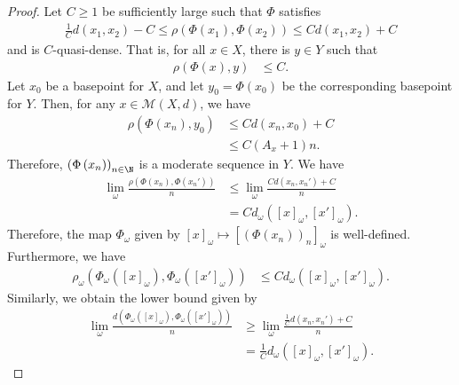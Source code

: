 \documentclass[10pt]{mypackage}
\begin{document}
\begin{proof}
  Let $C \geq 1$ be sufficiently large such that $\Phi$ satisfies
  \begin{align*}
    \frac{1}{C}d\left( x_1,x_2 \right) - C \leq \rho\left( \Phi\left(x_1\right),\Phi\left( x_2 \right) \right) \leq Cd\left( x_1,x_2 \right) + C
  \end{align*}
  and is $C$-quasi-dense. That is, for all $x\in X$, there is $y\in Y$ such that
  \begin{align*}
    \rho\left( \Phi(x),y \right) &\leq C.
  \end{align*}
  Let $x_0$ be a basepoint for $X$, and let $y_0 = \Phi\left( x_0 \right)$ be the corresponding basepoint for $Y$. Then, for any $x\in \mathcal{M}\left( X,d \right)$, we have
  \begin{align*}
    \rho\left( \Phi\left( x_n \right),y_0 \right) &\leq Cd\left( x_n,x_0 \right) + C\\
                                                  &\leq C\left( A_x + 1 \right)n.
  \end{align*}
  Therefore, $\left( \Phi\left( x_n \right) \right)_{n\in \N}$ is a moderate sequence in $Y$. We have
  \begin{align*}
    \lim_{\omega} \frac{\rho\left( \Phi\left( x_n \right),\Phi\left( x_n' \right) \right)}{n} &\leq \lim_{\omega} \frac{Cd\left( x_n,x_n' \right) + C}{n}\\
                                                                                              &= Cd_{\omega}\left( \left[ x \right]_{\omega},\left[ x' \right]_{\omega} \right).
  \end{align*}
  Therefore, the map $\Phi_{\omega}$ given by $\left[ x \right]_{\omega}\mapsto \left[ \left( \Phi\left( x_n \right) \right)_n \right]_{\omega}$ is well-defined. Furthermore, we have
  \begin{align*}
    \rho_{\omega}\left( \Phi_{\omega}\left( \left[ x \right]_{\omega} \right),\Phi_{\omega}\left( \left[ x' \right]_{\omega} \right) \right) &\leq Cd_{\omega}\left( \left[ x \right]_{\omega},\left[ x' \right]_{\omega} \right).
  \end{align*}
  Similarly, we obtain the lower bound given by
  \begin{align*}
    \lim_{\omega} \frac{d\left( \Phi_{\omega}\left( \left[ x \right]_{\omega} \right),\Phi_{\omega}\left( \left[ x' \right]_{\omega} \right) \right)}{n} &\geq \lim_{\omega} \frac{\frac{1}{C}d\left( x_n,x_n' \right) + C}{n}\\
                                                                                           &= \frac{1}{C}d_{\omega}\left( \left[ x \right]_{\omega},\left[ x' \right]_{\omega} \right).

\end{align*}
\end{proof}
\end{document}
